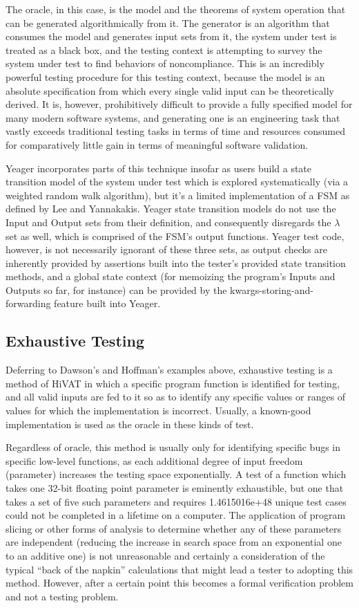 The oracle, in this case, is the model and the theorems of system operation that can be generated algorithmically from it. The generator is an algorithm that consumes the model and generates input sets from it, the system under test is treated as a black box, and the testing context is attempting to survey the system under test to find behaviors of noncompliance. This is an incredibly powerful testing procedure for this testing context, because the model is an absolute specification from which every single valid input can be theoretically derived. It is, however, prohibitively difficult to provide a fully specified model for many modern software systems, and generating one is an engineering task that vastly exceeds traditional testing tasks in terms of time and resources consumed for comparatively little gain in terms of meaningful software validation.

Yeager incorporates parts of this technique insofar as users build a state transition model of the system under test which is explored systematically (via a weighted random walk algorithm), but it's a limited implementation of a FSM as defined by Lee and Yannakakis. Yeager state transition models do not use the Input and Output sets from their definition, and consequently disregards the $\lambda$ set as well, which is comprised of the FSM's output functions. Yeager test code, however, is not necessarily ignorant of these three sets, as output checks are inherently provided by assertions built into the tester's provided state transition methods, and a global state context (for memoizing the program's Inputs and Outputs so far, for instance) can be provided by the kwargs-storing-and-forwarding feature built into Yeager.

\subsection{Exhaustive Testing}
Deferring to Dawson's and Hoffman's examples above, exhaustive testing is a method of HiVAT in which a specific program function is identified for testing, and all valid inputs are fed to it so as to identify any specific values or ranges of values for which the implementation is incorrect. Usually, a known-good implementation is used as the oracle in these kinds of test.

Regardless of oracle, this method is usually only for identifying specific bugs in specific low-level functions, as each additional degree of input freedom (parameter) increases the testing space exponentially. A test of a function which takes one 32-bit floating point parameter is eminently exhaustible, but one that takes a set of five such parameters and requires 1.4615016e+48 unique test cases could not be completed in a lifetime on a computer. The application of program slicing \citep{gallagher1991using} or other forms of analysis to determine whether any of these parameters are independent (reducing the increase in search space from an exponential one to an additive one) is not unreasonable and certainly a consideration of the typical ``back of the napkin'' calculations that might lead a tester to adopting this method. However, after a certain point this becomes a formal verification problem and not a testing problem.

